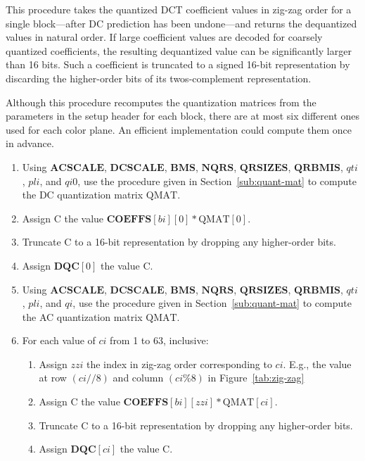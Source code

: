 \documentclass[9pt,letterpaper]{book}
\newcommand{\idx}[1]{{\ensuremath{\mathit{#1}}}}
\newcommand{\qti}{\idx{qti}}
\newcommand{\pli}{\idx{pli}}
\newcommand{\qi}{\idx{qi}}
\newcommand{\ci}{\idx{ci}}
\newcommand{\bi}{\idx{bi}}
\newcommand{\zzi}{\idx{zzi}}
\newcommand{\bitvar}[1]{\ensuremath{\mathbf{\bm{#1}}}}
\newcommand{\locvar}[1]{\ensuremath{\mathrm{#1}}}
\numberwithin{equation}{chapter}
\numberwithin{figure}{chapter}
\numberwithin{table}{chapter}
\begin{document}
This procedure takes the quantized DCT coefficient values in zig-zag order for
 a single block---after DC prediction has been undone---and returns the
 dequantized values in natural order.
If large coefficient values are decoded for coarsely quantized coefficients,
 the resulting dequantized value can be significantly larger than 16 bits.
Such a coefficient is truncated to a signed 16-bit representation by discarding
 the higher-order bits of its twos-complement representation.

Although this procedure recomputes the quantization matrices from the
 parameters in the setup header for each block, there are at most six different
 ones used for each color plane.
An efficient implementation could compute them once in advance.

\begin{enumerate}
\item
Using \bitvar{ACSCALE}, \bitvar{DCSCALE}, \bitvar{BMS}, \bitvar{NQRS},
 \bitvar{QRSIZES}, \bitvar{QRBMIS}, \bitvar{\qti}, \bitvar{\pli}, and
 \bitvar{\idx{qi0}}, use the procedure given in Section~\ref{sub:quant-mat} to
 compute the DC quantization matrix \locvar{QMAT}.
\item
Assign \locvar{C} the value
 $\bitvar{COEFFS}[\bitvar{\bi}][0]*\locvar{QMAT}[0]$.
\item
Truncate \locvar{C} to a 16-bit representation by dropping any higher-order
 bits.
\item
Assign $\bitvar{DQC}[0]$ the value \locvar{C}.
\item
Using \bitvar{ACSCALE}, \bitvar{DCSCALE}, \bitvar{BMS}, \bitvar{NQRS},
 \bitvar{QRSIZES}, \bitvar{QRBMIS}, \bitvar{\qti}, \bitvar{\pli}, and
 \bitvar{\qi}, use the procedure given in Section~\ref{sub:quant-mat} to
 compute the AC quantization matrix \locvar{QMAT}.
\item
For each value of \locvar{\ci} from 1 to 63, inclusive:
\begin{enumerate}
\item
Assign \locvar{\zzi} the index in zig-zag order corresponding to \locvar{\ci}.
E.g., the value at row $(\locvar{\ci}//8)$ and column $(\locvar{\ci}\%8)$ in
 Figure~\ref{tab:zig-zag}
\item
Assign \locvar{C} the value
 $\bitvar{COEFFS}[\bitvar{\bi}][\locvar{\zzi}]*\locvar{QMAT}[\locvar{\ci}]$.
\item
Truncate \locvar{C} to a 16-bit representation by dropping any higher-order
 bits.
\item
Assign $\bitvar{DQC}[\locvar{\ci}]$ the value \locvar{C}.
\end{enumerate}
\end{enumerate}
\end{document}
